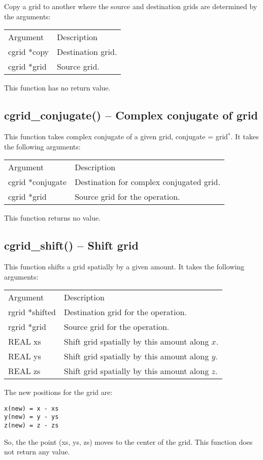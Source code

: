 \documentclass[12pt,letterpaper]{report}
\begin{document}
Copy a grid to another where the source and destination grids are determined by the arguments:
\begin{longtable}{p{} p{}}
Argument & Description\\
\cline{1-2}
cgrid *copy & Destination grid.\\
cgrid *grid & Source grid.\\
\end{longtable}
\noindent
This function has no return value.

\subsection{cgrid\_conjugate() -- Complex conjugate of grid}

This function takes complex conjugate of a given grid, conjugate = grid$^*$. It takes the following arguments:
\begin{longtable}{p{} p{}}
Argument & Description\\
\cline{1-2}
cgrid *conjugate & Destination for complex conjugated grid.\\
cgrid *grid & Source grid for the operation.\\
\end{longtable}
\noindent
This function returns no value.

\subsection{cgrid\_shift() -- Shift grid}

This function shifts a grid spatially by a given amount. It takes the following arguments:
\begin{longtable}{p{} p{}}
Argument & Description\\
\cline{1-2}
rgrid *shifted & Destination grid for the operation.\\
rgrid *grid & Source grid for the operation.\\
REAL xs & Shift grid spatially by this amount along $x$.\\
REAL ys & Shift grid spatially by this amount along $y$.\\
REAL zs & Shift grid spatially by this amount along $z$.\\
\end{longtable}
\noindent
The new positions for the grid are:
\begin{verbatim}
x(new) = x - xs 
y(new) = y - ys 
z(new) = z - zs
\end{verbatim}
\noindent
So, the the point (xs, ys, zs) moves to the center of the grid. This function does not return any value.
\end{document}
